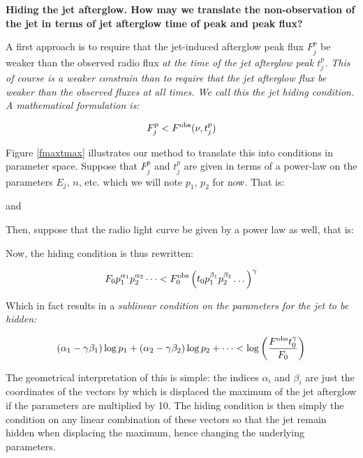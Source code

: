 \bf{Hiding the jet afterglow.} How may we translate the non-observation of the jet in terms of jet afterglow time of peak and peak flux?

A first approach is to require that the jet-induced afterglow peak flux $F_j^p$ be weaker than the observed radio flux \it{at the time of the jet afterglow peak} $t_j^p$. This of course is a weaker constrain than to require that the jet afterglow flux be \it{weaker than the observed fluxes at all times}. We call this the \it{jet hiding} condition. A mathematical formulation is:

$$F_j^p < F^{\rm{obs}}(\nu, t_j^p) $$

Figure \ref{fmaxtmax} illustrates our method to translate this into conditions in parameter space. Suppose that $F_j^p$ and $t_j^p$ are given in terms of a power-law on the parameters $E_j$, $n$, etc. which we will note $p_1$, $p_2$ for now. That is:


and


Then, suppose that the radio light curve be given by a power law as well, that is:

\cen{$\Fobs(\nu, \tobs) = \Fobs_0 \tobs^{\gamma}$}

Now, the hiding condition is thus rewritten:

$$F_0 p_1^{\alpha_1} p_2^{\alpha_2} \dots < \Fobs_0 \left( t_0 p_1^{\beta_1} p_2^{\beta_2} \dots \right)^{\gamma} $$

Which in fact results in a \it{sublinear condition} on the parameters for the jet to be hidden:

$$(\alpha_1 - \gamma \beta_1) \log p_1 + (\alpha_2 - \gamma \beta_2) \log p_2 + \dots < \log \left( \frac{\Fobs t_0 ^\gamma}{F_0} \right) $$

The geometrical interpretation of this is simple: the indices $\alpha_i$ and $\beta_i$ are just the coordinates of the vectors by which is displaced the maximum of the jet afterglow if the parameters are multiplied by 10. The hiding condition is then simply the condition on any linear combination of these vectors so that the jet remain hidden when displacing the maximum, hence changing the underlying parameters.



